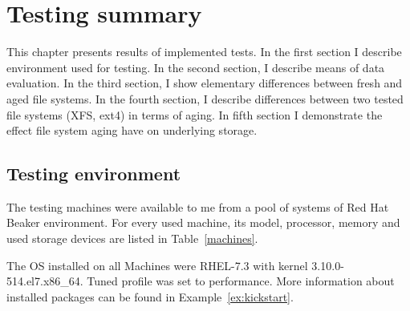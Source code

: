 \documentclass[
  color, %
  table, %
  lof,   %
  lot,   %
]{fithesis3}
\begin{document}
\chapter{Testing summary}
\label{results}
This chapter presents results of implemented tests. In the first section I describe environment used for testing. In the second section, I describe means of data evaluation. In the third section, I show elementary differences between fresh and aged file systems. In the fourth section, I describe differences between two tested file systems (XFS, ext4) in terms of aging. In fifth section I demonstrate the effect file system aging have on underlying storage.

\section{Testing environment}
\label{env}
The testing machines were available to me from a pool of systems of Red Hat Beaker environment. For every used machine, its model, processor, memory and used storage devices are listed in Table~\ref{machines}.

The OS installed on all Machines were RHEL-7.3 with kernel 3.10.0-514.el7.x86\_64. Tuned profile was set to performance. More information about installed packages can be found in Example~\ref{ex:kickstart}.

\clearpage
\end{document}
